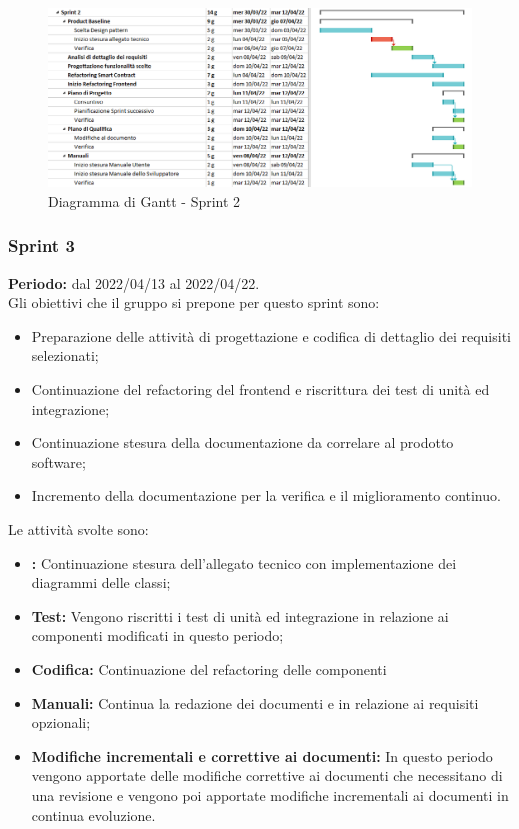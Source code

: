 \begin{figure}[H]
  \centering
  \includegraphics[scale=0.52]{immagini/2sprint.png}
  \caption{Diagramma di Gantt - Sprint 2}
\end{figure}

\subsubsection{Sprint 3} \label{subsubsection:sprint_3}
\textbf{Periodo:} dal 2022/04/13 al 2022/04/22.
\bigskip
\\Gli obiettivi che il gruppo si prepone per questo sprint\glo{} sono:
\begin{itemize}
  \item Preparazione delle attività di progettazione e codifica di dettaglio dei requisiti selezionati;
  \item Continuazione del refactoring\glo{} del frontend\glo{} e riscrittura dei test di unità ed integrazione;
  \item Continuazione stesura della documentazione da correlare al prodotto software;
  \item Incremento della documentazione per la verifica e il miglioramento continuo.
\end{itemize}
Le attività svolte sono:
\begin{itemize}
  \item \textbf{\PB{}:} Continuazione stesura dell’allegato tecnico con implementazione dei diagrammi delle classi;
  \item \textbf{Test:} Vengono riscritti i test di unità ed integrazione in relazione ai componenti modificati in questo periodo;
  \item \textbf{Codifica:} Continuazione del refactoring delle componenti
  \item \textbf{Manuali:} Continua la redazione dei documenti \docNameVersionMU{} e \docNameVersionMS{} in relazione ai requisiti opzionali;
  \item \textbf{Modifiche incrementali e correttive ai documenti:} In questo periodo vengono apportate delle modifiche correttive ai documenti che necessitano di una revisione e vengono poi apportate modifiche incrementali ai documenti in continua evoluzione.
\end{itemize}
